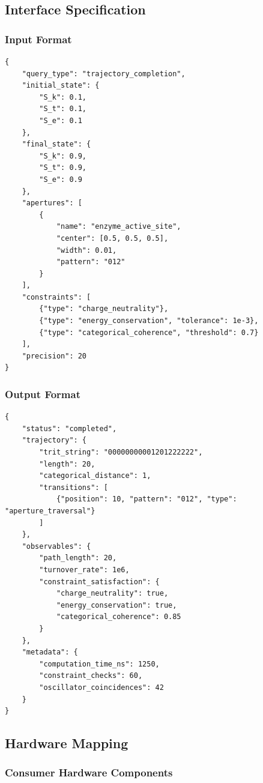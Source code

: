 \subsection{Interface Specification}

\subsubsection{Input Format}

\begin{verbatim}
{
    "query_type": "trajectory_completion",
    "initial_state": {
        "S_k": 0.1,
        "S_t": 0.1,
        "S_e": 0.1
    },
    "final_state": {
        "S_k": 0.9,
        "S_t": 0.9,
        "S_e": 0.9
    },
    "apertures": [
        {
            "name": "enzyme_active_site",
            "center": [0.5, 0.5, 0.5],
            "width": 0.01,
            "pattern": "012"
        }
    ],
    "constraints": [
        {"type": "charge_neutrality"},
        {"type": "energy_conservation", "tolerance": 1e-3},
        {"type": "categorical_coherence", "threshold": 0.7}
    ],
    "precision": 20
}
\end{verbatim}

\subsubsection{Output Format}

\begin{verbatim}
{
    "status": "completed",
    "trajectory": {
        "trit_string": "00000000001201222222",
        "length": 20,
        "categorical_distance": 1,
        "transitions": [
            {"position": 10, "pattern": "012", "type": "aperture_traversal"}
        ]
    },
    "observables": {
        "path_length": 20,
        "turnover_rate": 1e6,
        "constraint_satisfaction": {
            "charge_neutrality": true,
            "energy_conservation": true,
            "categorical_coherence": 0.85
        }
    },
    "metadata": {
        "computation_time_ns": 1250,
        "constraint_checks": 60,
        "oscillator_coincidences": 42
    }
}
\end{verbatim}

\subsection{Hardware Mapping}

\subsubsection{Consumer Hardware Components}

